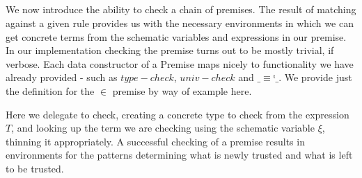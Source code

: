 \begin{code}%
\>[0]%
\>[7]\AgdaSymbol{:}%
\>[10]%
\>[34]\<%
\\
%
\>[10]\AgdaSpace{}%
%
\>[34]\<%
\\
%
\>[10]\AgdaSymbol{(}\AgdaSpace{}%
\AgdaSymbol{:}\AgdaSpace{}%
\AgdaSpace{}%
\AgdaSpace{}%
\AgdaSymbol{)}%
\>[34]\<%
\\
%
\>[10]\AgdaSymbol{(}\AgdaSpace{}%
\AgdaSymbol{:}\AgdaSpace{}%
\AgdaSpace{}%
\AgdaSpace{}%
\AgdaSymbol{)}%
\>[34]\<%
\\
%
\>[10]\AgdaSpace{}%
\<%
\\
\>[0]\<%
\\
\>[0]%
\>[7]\AgdaSymbol{:}%
\>[10]%
\>[33]\<%
\\
%
\>[10]\AgdaSpace{}%
%
\>[33]\<%
\\
%
\>[10]\AgdaSymbol{(}\AgdaSpace{}%
\AgdaSymbol{:}\AgdaSpace{}%
\AgdaSpace{}%
\AgdaSpace{}%
\AgdaSymbol{)}%
\>[33]\<%
\\
%
\>[10]\AgdaSpace{}%
\AgdaSymbol{(}\AgdaSpace{}%
\AgdaSpace{}%
\AgdaSymbol{)}\<%
\end{code}

We now introduce the ability to check a chain of premises. The result of
matching against a given rule provides us with the necessary environments
in which we can get concrete terms from the schematic variables and
expressions in our premise. In our implementation checking the premise
turns out to be mostly trivial, if verbose. Each data constructor of a Premise
maps nicely to functionality we have already provided - such as $type-check$,
$univ-check$ and $\_≡ᵗ\_$. We provide just the definition for the $∈$ premise
by way of example here.

Here we delegate to check, creating a concrete type to check from the
expression $T$, and looking up the term we are checking using the schematic
variable $ξ$, thinning it appropriately. A successful checking of a premise
results in environments for the patterns determining what is newly
trusted and what is left to be trusted.

